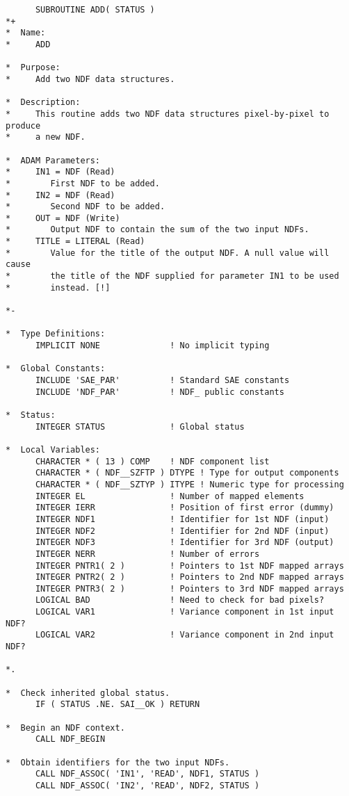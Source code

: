 \small
\begin{verbatim}
      SUBROUTINE ADD( STATUS )
*+
*  Name:
*     ADD

*  Purpose:
*     Add two NDF data structures.

*  Description:
*     This routine adds two NDF data structures pixel-by-pixel to produce
*     a new NDF.

*  ADAM Parameters:
*     IN1 = NDF (Read)
*        First NDF to be added.
*     IN2 = NDF (Read)
*        Second NDF to be added.
*     OUT = NDF (Write)
*        Output NDF to contain the sum of the two input NDFs.
*     TITLE = LITERAL (Read)
*        Value for the title of the output NDF. A null value will cause
*        the title of the NDF supplied for parameter IN1 to be used
*        instead. [!]

*-
      
*  Type Definitions:
      IMPLICIT NONE              ! No implicit typing

*  Global Constants:
      INCLUDE 'SAE_PAR'          ! Standard SAE constants
      INCLUDE 'NDF_PAR'          ! NDF_ public constants

*  Status:
      INTEGER STATUS             ! Global status

*  Local Variables:
      CHARACTER * ( 13 ) COMP    ! NDF component list
      CHARACTER * ( NDF__SZFTP ) DTYPE ! Type for output components
      CHARACTER * ( NDF__SZTYP ) ITYPE ! Numeric type for processing
      INTEGER EL                 ! Number of mapped elements
      INTEGER IERR               ! Position of first error (dummy)
      INTEGER NDF1               ! Identifier for 1st NDF (input)
      INTEGER NDF2               ! Identifier for 2nd NDF (input)
      INTEGER NDF3               ! Identifier for 3rd NDF (output)
      INTEGER NERR               ! Number of errors
      INTEGER PNTR1( 2 )         ! Pointers to 1st NDF mapped arrays
      INTEGER PNTR2( 2 )         ! Pointers to 2nd NDF mapped arrays
      INTEGER PNTR3( 2 )         ! Pointers to 3rd NDF mapped arrays
      LOGICAL BAD                ! Need to check for bad pixels?
      LOGICAL VAR1               ! Variance component in 1st input NDF?
      LOGICAL VAR2               ! Variance component in 2nd input NDF?

*.

*  Check inherited global status.
      IF ( STATUS .NE. SAI__OK ) RETURN

*  Begin an NDF context.
      CALL NDF_BEGIN

*  Obtain identifiers for the two input NDFs.
      CALL NDF_ASSOC( 'IN1', 'READ', NDF1, STATUS )
      CALL NDF_ASSOC( 'IN2', 'READ', NDF2, STATUS )


\end{verbatim}
